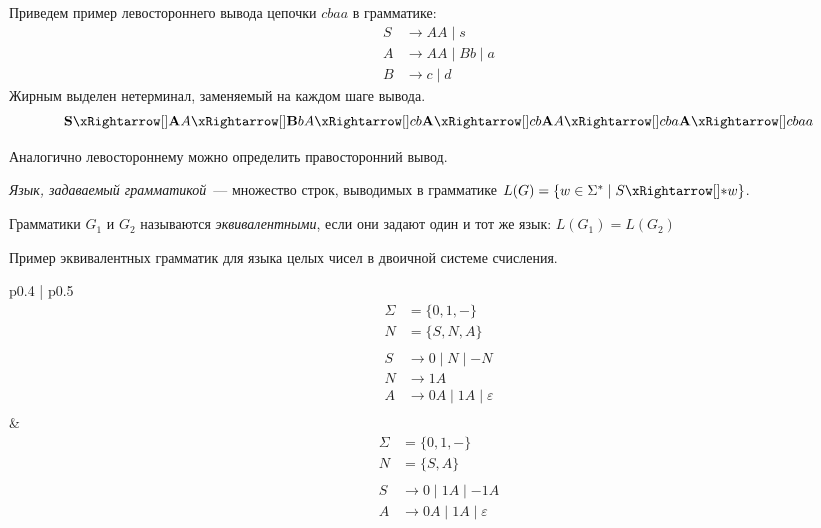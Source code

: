 \begin{example}
    Приведем пример левостороннего вывода цепочки $cbaa$ в грамматике:
    \begin{align*}
        S & \rightarrow A A \mid s          \\
        A & \rightarrow A A \mid B b \mid a \\
        B & \rightarrow c \mid d
    \end{align*}
    Жирным выделен нетерминал, заменяемый на каждом шаге вывода.
    \[ \mathbf{S} \derives[] \mathbf{A} A \derives[] \mathbf{B} b A \derives[] c b \mathbf{A} \derives[] c b \mathbf{A} A \derives[] c b a \mathbf{A} \derives[] c b a a \]
\end{example}

Аналогично левостороннему можно определить правосторонний вывод.

\begin{definition}[Язык]
    \emph{Язык, задаваемый грамматикой}~--- множество строк, выводимых в грамматике $L(G) = \{ w \in \Sigma^* \mid S \derives w \}$.
\end{definition}

\begin{definition}
    Грамматики $G_1$ и $G_2$ называются \emph{эквивалентными}, если они задают один и тот же язык: $L(G_1) = L(G_2)$
\end{definition}

\begin{example}  Пример эквивалентных грамматик для языка целых чисел в двоичной системе счисления.

    \begin{tabular}{p{} | p{}}
        \[
            \begin{aligned}
                \Sigma & = \{ 0, 1, - \}                            \\
                N      & = \{ S, N, A \}                            \\~\\
                S      & \rightarrow 0 \mid N \mid - N              \\
                N      & \rightarrow 1 A                            \\
                A      & \rightarrow 0 A \mid 1 A  \mid \varepsilon \\
            \end{aligned}
        \]
         &
        \[
            \begin{aligned}
                \Sigma & = \{ 0, 1, - \}                            \\
                N      & = \{ S, A \}                               \\~\\
                S      & \rightarrow 0 \mid 1 A  \mid - 1 A         \\
                A      & \rightarrow 0 A \mid 1 A  \mid \varepsilon \\
            \end{aligned}
        \]
    \end{tabular}

\end{example}


